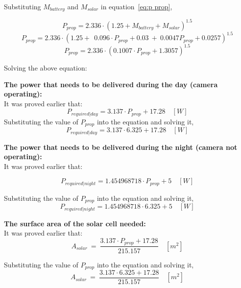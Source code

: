 \p Substituting $ M_{battery} $ and $ M_{solar} $ in equation~\ref{eq:p prop},

\[
P_{prop} = 2.336 \cdot (1.25 + M_{battery} + M_{solar})^{1.5}
\]
\[
P_{prop} = 2.336 \cdot (1.25 + \ \ 0.096 \cdot P_{prop} + 0.03 \ + \ 0.0047 P_{prop} + 0.0257 )^{1.5}
\]
\[
P_{prop} = 2.336 \cdot ( 0.1007 \cdot P_{prop} + 1.3057 )^{1.5}
\]

Solving the above equation: \begin{center}  \end{center} \vspace{1cm}

\p \textbf{The power that needs to be delivered during the day (camera operating):} \vspace{0.1cm}\\
It was proved earlier that:
\[
P_{required|day} = 3.137 \cdot P_{prop} + 17.28 \quad [W]
\]
Substituting the value of $ P_{prop} $ into the equation and solving it,
\[
P_{required|day} = 3.137 \cdot 6.325 + 17.28 \quad [W]
\]
\begin{center}  \end{center} \vspace{1cm}

\p \textbf{The power that needs to be delivered during the night (camera not operating):} \vspace{0.1cm}\\
It was proved earlier that:

\[
P_{required | night} = 1.454968718 \cdot P_{prop} + 5 \quad [W]
\]

Substituting the value of $ P_{prop} $ into the equation and solving it,
\[
P_{required | night} = 1.454968718 \cdot 6.325 + 5 \quad [W]
\]
\begin{center}  \end{center} \vspace{1cm}

\p \textbf{The surface area of the solar cell needed:} \vspace{0.1cm}\\
It was proved earlier that: \[ A_{solar} \ = \ \frac{ 3.137 \cdot P_{prop} + 17.28 }{ 215.157 } \quad [m^2] \]

Substituting the value of $ P_{prop} $ into the equation and solving it, \[ A_{solar} \ = \ \frac{ 3.137 \cdot 6.325 + 17.28 }{ 215.157 } \quad [m^2] \] \begin{center}  \end{center} \vspace{1cm}


